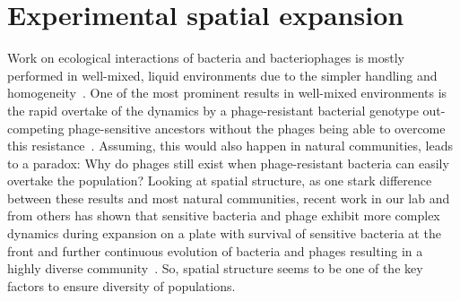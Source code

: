 \section{Experimental spatial expansion}
Work on ecological interactions of bacteria and bacteriophages is mostly performed in well-mixed, liquid environments due to the simpler handling and homogeneity~\cite{Bull2018-ha}. One of the most prominent results in well-mixed environments is the rapid overtake of the dynamics by a phage-resistant bacterial genotype out-competing phage-sensitive ancestors without the phages being able to overcome this resistance~\cite{Lenski1985-wb}.
Assuming, this would also happen in natural communities, leads to a paradox: Why do phages still exist when phage-resistant bacteria can easily overtake the population? Looking at spatial structure, as one stark difference between these results and most natural communities, recent work in our lab and from others has shown that sensitive bacteria and phage exhibit more complex dynamics during expansion on a plate with survival of sensitive bacteria at the front and further continuous evolution of bacteria and phages resulting in a highly diverse community~\cite{Shaer-Tamar2022-cq, Marchi2025-yu, Ping2020-vd}. So, spatial structure seems to be one of the key factors to ensure diversity of populations.

